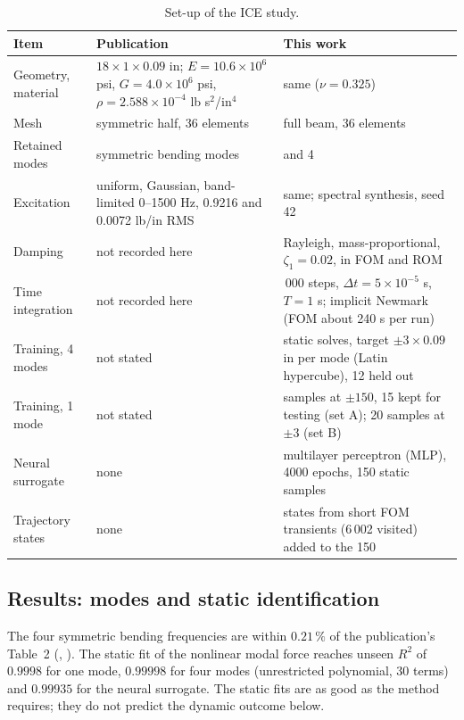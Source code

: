 \begin{table}[tbp]
\centering\footnotesize
\caption{Set-up of the ICE study.}\label{tab:vf-ice-setup}
\begin{tabularx}{\linewidth}{@{}>{\raggedright\arraybackslash}p{2.8cm} >{\raggedright\arraybackslash}X >{\raggedright\arraybackslash}X@{}}
\toprule
Item & Publication & This work\\
\midrule
Geometry, material & $18\times1\times0.09$ in; $E=10.6\times10^6$ psi, $G=4.0\times10^6$ psi, $\rho=2.588\times10^{-4}$ lb s$^2$/in$^4$ & same ($\nu=0.325$)\\
Mesh & symmetric half, 36 elements & full beam, 36 elements\\
Retained modes & 4 symmetric bending modes & 1 and 4\\
Excitation & uniform, Gaussian, band-limited 0--1500 Hz, 0.9216 and 0.0072 lb/in RMS & same; spectral synthesis, seed 42\\
Damping & not recorded here & Rayleigh, mass-proportional, $\zeta_1=0.02$, in FOM and ROM\\
Time integration & not recorded here & 20\,000 steps, $\Delta t=5\times10^{-5}$ s, $T=1$ s; implicit Newmark (FOM about 240 s per run)\\
Training, 4 modes & not stated & 150 static solves, target $\pm3\times0.09$ in per mode (Latin hypercube), 12 held out\\
Training, 1 mode & not stated & 60 samples at $\pm150$, 15 kept for testing (set A); 20 samples at $\pm3$ (set B)\\
Neural surrogate & none & multilayer perceptron (MLP), 4000 epochs, 150 static samples\\
Trajectory states & none & 80 states from short FOM transients (6\,002 visited) added to the 150\\
\bottomrule
\end{tabularx}
\end{table}

\subsection*{Results: modes and static identification}

The four symmetric bending frequencies are within $0.21\,\%$ of the publication's Table~2 (, ). The static fit of the nonlinear modal force reaches unseen $R^2$ of $0.9998$ for one mode, $0.99998$ for four modes (unrestricted polynomial, 30 terms) and $0.99935$ for the neural surrogate. The static fits are as good as the method requires; they do not predict the dynamic outcome below.

